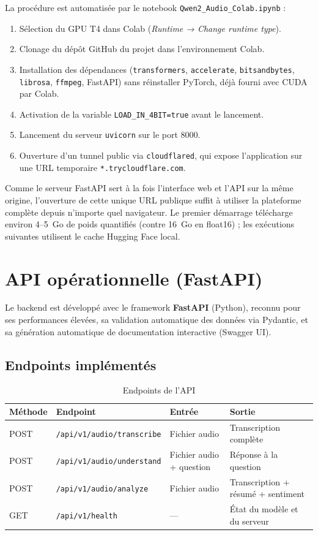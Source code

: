 \documentclass[12pt,a4paper]{report}
\begin{document}
La procédure est automatisée par le notebook \texttt{Qwen2\_Audio\_Colab.ipynb} :

\begin{enumerate}
  \item Sélection du GPU T4 dans Colab (\textit{Runtime → Change runtime type}).
  \item Clonage du dépôt GitHub du projet dans l'environnement Colab.
  \item Installation des dépendances (\texttt{transformers}, \texttt{accelerate},
        \texttt{bitsandbytes}, \texttt{librosa}, \texttt{ffmpeg}, FastAPI) sans
        réinstaller PyTorch, déjà fourni avec CUDA par Colab.
  \item Activation de la variable \texttt{LOAD\_IN\_4BIT=true} avant le lancement.
  \item Lancement du serveur \texttt{uvicorn} sur le port 8000.
  \item Ouverture d'un tunnel public via \texttt{cloudflared}, qui expose
        l'application sur une URL temporaire \texttt{*.trycloudflare.com}.
\end{enumerate}

Comme le serveur FastAPI sert à la fois l'interface web et l'API sur la même origine,
l'ouverture de cette unique URL publique suffit à utiliser la plateforme complète
depuis n'importe quel navigateur. Le premier démarrage télécharge environ 4--5~Go de
poids quantifiés (contre 16~Go en float16) ; les exécutions suivantes utilisent le
cache Hugging Face local.

\section{API opérationnelle (FastAPI)}

Le backend est développé avec le framework \textbf{FastAPI} \cite{fastapi} (Python),
reconnu pour ses performances élevées, sa validation automatique des données via Pydantic,
et sa génération automatique de documentation interactive (Swagger UI).

\subsection{Endpoints implémentés}

\begin{table}[h]
\centering
{}
\begin{tabularx}{\textwidth}{llXX}
\toprule
\textbf{Méthode} & \textbf{Endpoint} & \textbf{Entrée} & \textbf{Sortie} \\
\midrule
POST & \texttt{/api/v1/audio/transcribe} & Fichier audio & Transcription complète \\
POST & \texttt{/api/v1/audio/understand} & Fichier audio + question & Réponse à la question \\
POST & \texttt{/api/v1/audio/analyze}    & Fichier audio & Transcription + résumé + sentiment \\
GET  & \texttt{/api/v1/health}           & ---           & État du modèle et du serveur \\
\bottomrule
\end{tabularx}
\caption{Endpoints de l'API}
\end{table}
\end{document}
